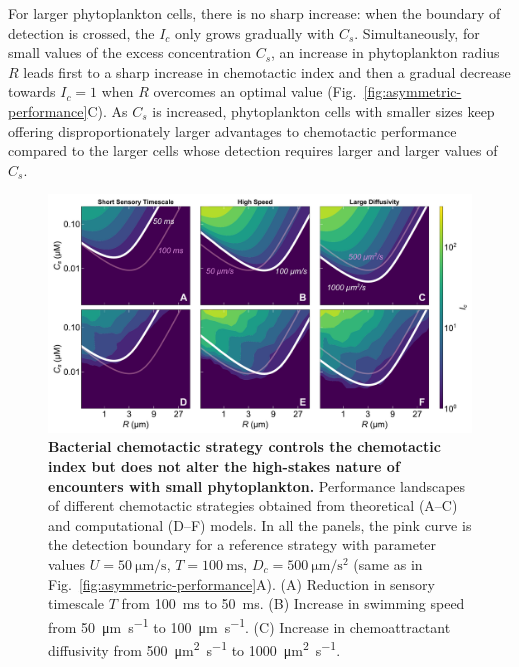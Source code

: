\documentclass[9pt,twocolumn,twoside]{pnas-new}
\begin{document}
For larger phytoplankton cells, there is no sharp increase: when the boundary of detection is crossed, the $I_c$ only grows gradually with $C_s$.
Simultaneously, for small values of the excess concentration $C_s$, an increase in phytoplankton radius $R$ leads first to a sharp increase in chemotactic index and then a gradual decrease towards $I_c=1$ when $R$ overcomes an optimal value (Fig.~\ref{fig:asymmetric-performance}C). As $C_s$ is increased, phytoplankton cells with smaller sizes keep offering disproportionately larger advantages to chemotactic performance compared to the larger cells whose detection requires larger and larger values of $C_s$.





\begin{figure}
    \centering
    \includegraphics[width=17.8cm]{fig4_mod.pdf}
    \caption{
        \textbf{
        Bacterial chemotactic strategy controls the chemotactic index but does not alter the high-stakes nature of encounters with small phytoplankton.
        }
        Performance landscapes of different chemotactic strategies obtained from theoretical (A--C) and computational (D--F) models.
        In all the panels, the pink curve is the detection boundary for a reference strategy with parameter values $U=\SI{50}{\micro\m\per\s}$, $T=\SI{100}{\milli\s}$, $D_c=\SI{500}{\micro\m\per\s^2}$ (same as in Fig.~\ref{fig:asymmetric-performance}A).
        (A) Reduction in sensory timescale $T$ from \SI{100}{\milli\s} to \SI{50}{\milli\s}.
        (B) Increase in swimming speed from \SI{50}{\micro\m\per\s} to \SI{100}{\micro\m\per\s}.
        (C) Increase in chemoattractant diffusivity from \SI{500}{\micro\m^2\per\s} to \SI{1000}{\micro\m^2\per\s}.
}
\end{figure}
\end{document}
